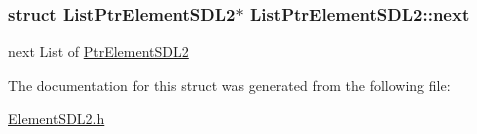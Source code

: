 \subsubsection[{\texorpdfstring{next}{next}}]{\setlength{\rightskip}{0pt plus 5cm}struct {\bf List\+Ptr\+Element\+S\+D\+L2}$\ast$ List\+Ptr\+Element\+S\+D\+L2\+::next}\hypertarget{structListPtrElementSDL2_a43cb2411041a437b88b3bf31c7200756}{}\label{structListPtrElementSDL2_a43cb2411041a437b88b3bf31c7200756}
next List of \hyperlink{structPtrElementSDL2}{Ptr\+Element\+S\+D\+L2} 

The documentation for this struct was generated from the following file\+:\begin{DoxyCompactItemize}
\item 
\hyperlink{ElementSDL2_8h}{Element\+S\+D\+L2.\+h}\end{DoxyCompactItemize}
